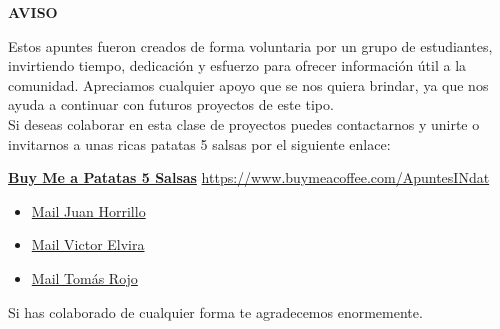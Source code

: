 \begin{center}
    \Huge \textbf{AVISO}
\end{center}

Estos apuntes fueron creados de forma voluntaria por un grupo de estudiantes, invirtiendo tiempo, dedicación y esfuerzo para ofrecer información útil a la comunidad. Apreciamos cualquier apoyo que se nos quiera brindar, ya que nos ayuda a continuar con futuros proyectos de este tipo. \\

Si deseas colaborar en esta clase de proyectos puedes contactarnos y unirte o invitarnos a unas ricas patatas 5 salsas por el siguiente enlace:

\vfil

\begin{center}
    \href{https://www.buymeacoffee.com/ApuntesINdat}{\LARGE \textbf{Buy Me a Patatas 5 Salsas}}
    \href{https://www.buymeacoffee.com/ApuntesINdat}{https://www.buymeacoffee.com/ApuntesINdat}
\end{center}

\begin{itemize}
    \item \href{mailto:juan.horrillo22@estudiantes.uva.es}{Mail Juan Horrillo}
    \item \href{mailto:victor.elvira22@estudiantes.uva.es}{Mail Victor Elvira}
    \item \href{mailto:tomas.rojo22@estudiantes.uva.es}{Mail Tomás Rojo}
\end{itemize}

\vfil

Si has colaborado de cualquier forma te agradecemos enormemente.
